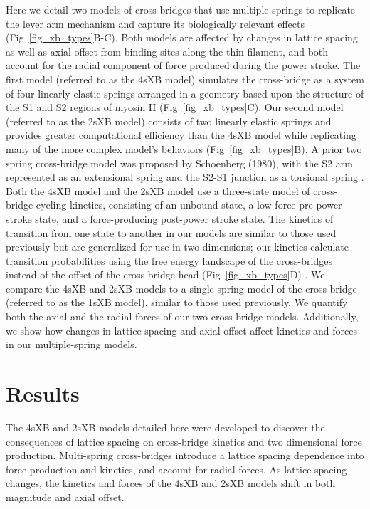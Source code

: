 \documentclass[10pt]{article}
\newcommand{\citep}[1]{\cite{#1}} %
\begin{document}
Here we detail two models of cross-bridges that use multiple springs to replicate the lever arm mechanism and capture its biologically relevant effects (Fig~\ref{fig_xb_types}B-C).  
Both models are affected by changes in lattice spacing as well as axial offset from binding sites along the thin filament, and both account for the radial component of force produced during the power stroke.  
The first model (referred to as the 4sXB model) simulates the cross-bridge as a system of four linearly elastic springs arranged in a geometry based upon the structure of the S1 and S2 regions of myosin II (Fig~\ref{fig_xb_types}C).  
Our second model (referred to as the 2sXB model) consists of two linearly elastic springs and provides greater computational efficiency than the 4sXB model while replicating many of the more complex model's behaviors (Fig~\ref{fig_xb_types}B). 
A prior two spring cross-bridge model was proposed by Schoenberg (1980), with the S2 arm represented as an extensional spring and the S2-S1 junction as a torsional spring \citep{Schoenberg1980a, Schoenberg1980b}. 
Both the 4sXB model and the 2sXB model use a three-state model of cross-bridge cycling kinetics, consisting of an unbound state, a low-force pre-power stroke state, and a force-producing post-power stroke state. 
The kinetics of transition from one state to another in our models are similar to those used previously but are generalized for use in two dimensions; our kinetics calculate transition probabilities using the free energy landscape of the cross-bridges instead of the offset of the cross-bridge head (Fig~\ref{fig_xb_types}D) \citep{Pate1989, Daniel1998, Takagi2004, Tanner2007}. 
We compare the 4sXB and 2sXB models to a single spring model of the cross-bridge (referred to as the 1sXB model), similar to those used previously. 
We quantify both the axial and the radial forces of our two cross-bridge models. 
Additionally, we show how changes in lattice spacing and axial offset affect kinetics and forces in our multiple-spring models. 


\section*{Results} %

The 4sXB and 2sXB models detailed here were developed to discover the consequences of lattice spacing on cross-bridge kinetics and two dimensional force production.
Multi-spring cross-bridges introduce a lattice spacing dependence into force production and kinetics, and account for radial forces. 
As lattice spacing changes, the kinetics and forces of the 4sXB and 2sXB models shift in both magnitude and axial offset.
\end{document}
